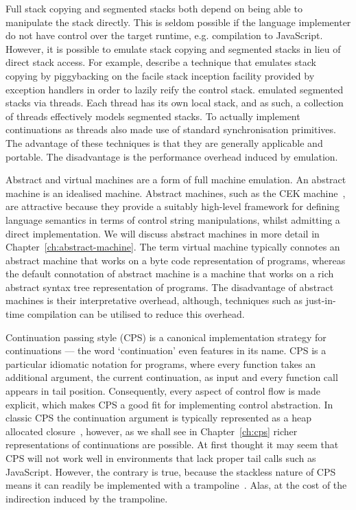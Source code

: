 \documentclass[12pt,phd,lfcs,twoside,openright,logo,leftchapter,normalheadings]{infthesis}
\theoremstyle{plain}
\theoremstyle{definition}
\begin{document}
Full stack copying and segmented stacks both depend on being able to
manipulate the stack directly. This is seldom possible if the language
implementer do not have control over the target runtime,
e.g. compilation to JavaScript. However, it is possible to emulate
stack copying and segmented stacks in lieu of direct stack access. For
example, \citet{PettyjohnCMKF05} describe a technique that emulates
stack copying by piggybacking on the facile stack inception facility
provided by exception handlers in order to lazily reify the control
stack.
%
\citet{KumarBD98} emulated segmented stacks via threads. Each thread
has its own local stack, and as such, a collection of threads
effectively models segmented stacks. To actually implement
continuations as threads \citeauthor{KumarBD98} also made use of
standard synchronisation primitives.
%
The advantage of these techniques is that they are generally
applicable and portable. The disadvantage is the performance overhead
induced by emulation.

Abstract and virtual machines are a form of full machine emulation. An
abstract machine is an idealised machine. Abstract machines, such as
the CEK machine~\cite{FelleisenF86}, are attractive because they
provide a suitably high-level framework for defining language
semantics in terms of control string manipulations, whilst admitting a
direct implementation.
%
We will discuss abstract machines in more detail in
Chapter~\ref{ch:abstract-machine}.
%
The term virtual machine typically connotes an abstract machine that
works on a byte code representation of programs, whereas the default
connotation of abstract machine is a machine that works on a rich
abstract syntax tree representation of programs.
%
The disadvantage of abstract machines is their interpretative
overhead, although, techniques such as just-in-time compilation can be
utilised to reduce this overhead.

Continuation passing style (CPS) is a canonical implementation
strategy for continuations --- the word `continuation' even features in
its name.
%
CPS is a particular idiomatic notation for programs, where every
function takes an additional argument, the current continuation, as
input and every function call appears in tail position. Consequently,
every aspect of control flow is made explicit, which makes CPS a good
fit for implementing control abstraction. In classic CPS the
continuation argument is typically represented as a heap allocated
closure~\cite{Appel92}, however, as we shall see in
Chapter~\ref{ch:cps} richer representations of continuations are
possible.
%
At first thought it may seem that CPS will not work well in
environments that lack proper tail calls such as JavaScript. However,
the contrary is true, because the stackless nature of CPS means it can
readily be implemented with a trampoline~\cite{GanzFW99}. Alas, at the
cost of the indirection induced by the trampoline.
\end{document}
